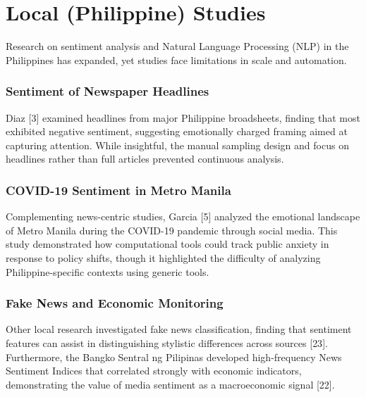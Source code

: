 \section{Local (Philippine) Studies}\label{local-philippine-studies}

Research on sentiment analysis and Natural Language Processing (NLP) in the Philippines has expanded, yet studies face limitations in scale and automation.

\subsubsection{\texorpdfstring{\textbf{Sentiment of Newspaper Headlines}}{Sentiment of Newspaper Headlines}}\label{sentiment-of-newspaper-headlines}

Diaz {[}3{]} examined headlines from major Philippine broadsheets, finding that most exhibited negative sentiment, suggesting emotionally charged framing aimed at capturing attention. While insightful, the manual sampling design and focus on headlines rather than full articles prevented continuous analysis.

\subsubsection{\texorpdfstring{\textbf{COVID-19 Sentiment in Metro Manila}}{COVID-19 Sentiment in Metro Manila}}\label{covid-19-sentiment-in-metro-manila}

Complementing news-centric studies, Garcia {[}5{]} analyzed the emotional landscape of Metro Manila during the COVID-19 pandemic through social media. This study demonstrated how computational tools could track public anxiety in response to policy shifts, though it highlighted the difficulty of analyzing Philippine-specific contexts using generic tools.

\subsubsection{\texorpdfstring{\textbf{Fake News and Economic Monitoring}}{Fake News and Economic Monitoring}}\label{fake-news-and-economic-monitoring}

Other local research investigated fake news classification, finding that sentiment features can assist in distinguishing stylistic differences across sources {[}23{]}. Furthermore, the Bangko Sentral ng Pilipinas developed high-frequency News Sentiment Indices that correlated strongly with economic indicators, demonstrating the value of media sentiment as a macroeconomic signal {[}22{]}.

